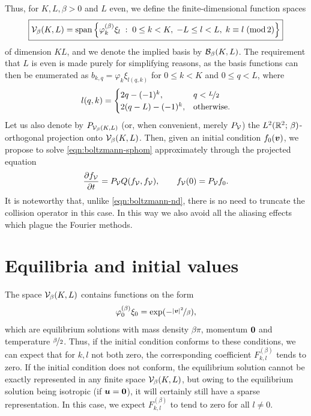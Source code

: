 Thus, for $K,L,\beta>0$ and $L$ even, we define the finite-dimensional function spaces
\[ \boxed{
    \mathcal{V}_\beta(K,L) = \operatorname{span} \left\{ \varphi^{(\beta)}_k\xi_l \;:\; 0\leq k < K, \; -L \leq l < L, \;
    k \equiv l \;(\operatorname{mod} 2) \right\}
} \]
of dimension $KL$, and we denote the implied basis by $\mathcal{B}_\beta(K,L)$. The requirement that $L$ is even is
made purely for simplifying reasons, as the basis functions can then be enumerated as $b_{k,q} = \varphi_k
\xi_{l(q,k)}$ for $0 \leq k < K$ and $0 \leq q < L$, where
\begin{equation} \label{eqn:pol-enum}
    l(q,k) = \begin{cases} 2q - (-1)^k,& q < \nicefrac{L}{2} \\
                           2(q-L) - (-1)^k,& \text{otherwise}.
             \end{cases}
\end{equation}
Let us also denote by $P_{\mathcal{V}_\beta(K,L)}$ (or, when convenient, merely $P_{\mathcal{V}}$) the
$L^2(\mathbb{R}^2;\,\beta)$-orthogonal projection onto $\mathcal{V}_\beta(K,L)$. Then, given an initial condition
$f_0({\bm v})$, we propose to solve \eqref{eqn:boltzmann-sphom} approximately through the projected equation
\[
    \frac{\partial f_{\mathcal{V}}}{\partial t} = P_{\mathcal{V}} Q(f_{\mathcal{V}},f_{\mathcal{V}}), \qquad
    f_{\mathcal{V}}(0) = P_{\mathcal{V}} f_0.
\]
It is noteworthy that, unlike \eqref{eqn:boltzmann-nd}, there is no need to truncate the collision operator in
this case. In this way we also avoid all the aliasing effects which plague the Fourier methods.

\section{Equilibria and initial values}
\label{sec:polar-equilibria}

The space $\mathcal{V}_\beta(K,L)$ contains functions on the form
\[
    \varphi^{(\beta)}_0\xi_0 = \exp(-\nicefrac{|{\bm v}|^2}{\beta}),
\]
which are equilibrium solutions with mass density $\beta\pi$, momentum ${\bm0}$ and temperature
$\nicefrac{\beta}{2}$. Thus, if the initial condition conforms to these conditions, we can expect that for
$k,l$ not both zero, the corresponding coefficient $F^{(\beta)}_{k,l}$ tends to zero.  If the initial
condition does not conform, the equilibrium solution cannot be exactly represented in any finite space
$\mathcal{V}_\beta(K,L)$, but owing to the equilibrium solution being isotropic (if ${\bm u}={\bm0}$), it will certainly
still have a sparse representation. In this case, we expect $F^{(\beta)}_{k,l}$ to tend to zero for all
$l\neq0$.

